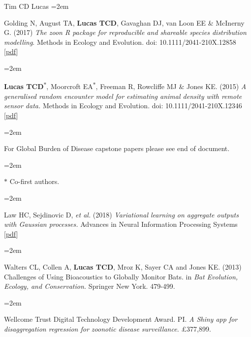 \documentclass{scrartcl}
\newcommand{\MarginText}[1]{\marginpar{\raggedleft\itshape\small#1}} %
\newcommand{\Description}[1]{\hangindent=2em\hangafter=0\noindent\raggedright\footnotesize{#1}\par\normalsize\vspace{1em}} %
\begin{document}
\begin{cv}{Tim {\Large CD} Lucas}
\Description{Golding N, August TA, \textbf{Lucas TCD}, Gavaghan DJ, van Loon EE \& McInerny G. (2017) \emph{The zoon R package for reproducible and shareable species distribution modelling}. Methods in Ecology and Evolution. doi: 10.1111/2041-210X.12858 [\href{http://onlinelibrary.wiley.com/doi/10.1111/2041-210X.12858/pdf}{pdf}]}

\Description{\MarginText{2015}\textbf{Lucas TCD}\textsuperscript{$\ast$}, Moorcroft EA\textsuperscript{$\ast$}, Freeman R, Rowcliffe MJ \& Jones KE. (2015) \emph{A generalised random encounter model for estimating animal density with remote sensor data.} Methods in Ecology and Evolution. doi: 10.1111/2041-210X.12346 [\href{http://onlinelibrary.wiley.com/doi/10.1111/2041-210X.12346/epdf}{pdf}]}


\Description{\MarginText{GBD}For Global Burden of Disease capstone papers please see end of document.}

\Description{\MarginText{} \scriptsize{ $\ast$ Co-first authors. } }



{\color{Maroon}}\vspace{1em}


\Description{\MarginText{2018}Law HC, Sejdinovic D, \emph{et al.} (2018) \emph{Variational learning on aggregate outputs with Gaussian processes.} Advances in Neural Information Processing Systems [\href{http://papers.nips.cc/paper/7847-variational-learning-on-aggregate-outputs-with-gaussian-processes.pdf}{pdf}]}

\Description{\MarginText{2013}Walters CL, Collen A, \textbf{Lucas TCD}, Mroz K, Sayer CA and Jones KE. (2013) Challenges of Using Bioacoustics to Globally Monitor Bats. in \emph{Bat Evolution, Ecology, and Conservation.} Springer New York. 479-499.}

\vspace{1em} %




{\color{Maroon}}\vspace{1em}  %



\Description{\MarginText{2023}Wellcome Trust Digital Technology Development Award. PI. \emph{A Shiny app for disaggregation regression for zoonotic disease surveillance.} £377,899.}
\vspace{-0.5em} %



\end{cv}
\end{document}
